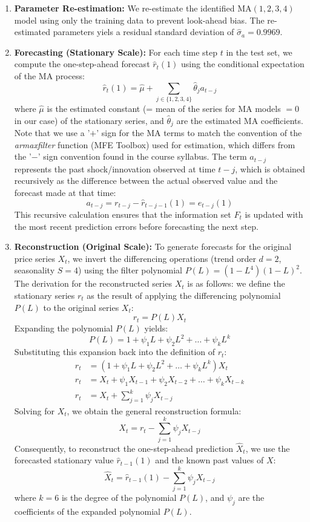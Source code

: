 \documentclass[11pt, a4paper]{article}
\begin{document}
\begin{enumerate}
    \item \textbf{Parameter Re-estimation:} We re-estimate the identified $\mathrm{MA}(1,2,3,4)$ model using only the training data to prevent look-ahead bias. The re-estimated parameters yiels a residual standard deviation of $\hat{\sigma}_a = 0.9969$.
    \item \textbf{Forecasting (Stationary Scale):} For each time step $t$ in the test set, we compute the one-step-ahead forecast $\hat{r}_t(1)$ using the conditional expectation of the MA process:
    \[
        \hat{r}_t(1) = \hat{\mu} + \sum_{j \in \{1,2,3,4\}} \hat{\theta}_j a_{t-j}
    \]
    where $\hat{\mu}$ is the estimated constant (= mean of the series for MA models $= 0$ in our case) of the stationary series, and $\hat{\theta}_j$ are the estimated MA coefficients. Note that we use a '$+$' sign for the MA terms to match the convention of the \textit{armaxfilter} function (MFE Toolbox) used for estimation, which differs from the '$-$' sign convention found in the course syllabus. The term $a_{t-j}$ represents the past shock/innovation observed at time $t-j$, which is obtained recursively as the difference between the actual observed value and the forecast made at that time:
    \[
        a_{t-j} = r_{t-j} - \hat{r}_{t-j-1}(1) = e_{t-j}(1)
    \]
    This recursive calculation ensures that the information set $F_t$ is updated with the most recent prediction errors before forecasting the next step.
    \item \textbf{Reconstruction (Original Scale):} To generate forecasts for the original price series $X_t$, we invert the differencing operations (trend order $d=2$, seasonality $S=4$) using the filter polynomial $P(L) = (1-L^4)(1-L)^2$. The derivation for the reconstructed series $X_t$ is as follows: we define the stationary series $r_t$ as the result of applying the differencing polynomial $P(L)$ to the original series $X_t$:
    \[
        r_t = P(L) X_t
    \]
    Expanding the polynomial $P(L)$ yields:
    \[
        P(L) = 1 + \psi_1 L + \psi_2 L^2 + \dots + \psi_k L^k
    \]
    Substituting this expansion back into the definition of $r_t$:
    \begin{align}
        r_t &= (1 + \psi_1 L + \psi_2 L^2 + \dots + \psi_k L^k) X_t \\
        r_t &= X_t + \psi_1 X_{t-1} + \psi_2 X_{t-2} + \dots + \psi_k X_{t-k} \\
        r_t &= X_t + \sum_{j=1}^k \psi_j X_{t-j}
    \end{align}
    Solving for $X_t$, we obtain the general reconstruction formula:
    \[
        X_t = r_t - \sum_{j=1}^{k} \psi_j X_{t-j}
    \]
    Consequently, to reconstruct the one-step-ahead prediction $\hat{X}_t$, we use the forecasted stationary value $\hat{r}_{t-1}(1)$ and the known past values of $X$:
    \[
        \hat{X}_t = \hat{r}_{t-1}(1) - \sum_{j=1}^{k} \psi_j X_{t-j}
    \]
    where $k=6$ is the degree of the polynomial $P(L)$, and $\psi_j$ are the coefficients of the expanded polynomial $P(L)$. %
\end{enumerate}
\end{document}
